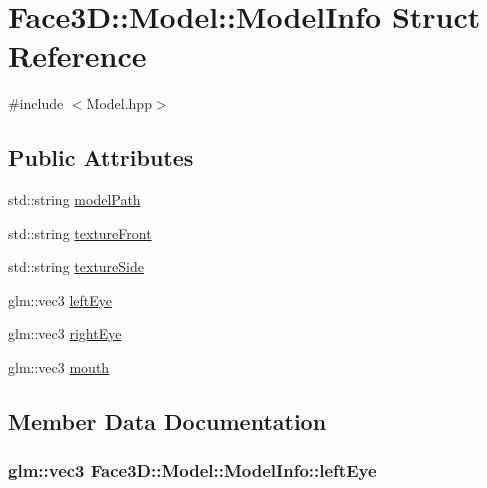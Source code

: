 \hypertarget{struct_face3_d_1_1_model_1_1_model_info}{}\section{Face3D\+:\+:Model\+:\+:Model\+Info Struct Reference}
\label{struct_face3_d_1_1_model_1_1_model_info}


{\ttfamily \#include $<$Model.\+hpp$>$}

\subsection*{Public Attributes}
\begin{DoxyCompactItemize}
\item 
std\+::string \hyperlink{struct_face3_d_1_1_model_1_1_model_info_a7f6cacf9ae39c86e2007f87dacff16e3}{model\+Path}
\item 
std\+::string \hyperlink{struct_face3_d_1_1_model_1_1_model_info_aa31a18f8553efbb08c1e06bbce4785d7}{texture\+Front}
\item 
std\+::string \hyperlink{struct_face3_d_1_1_model_1_1_model_info_a0afbed21c950938c52f4a02da26cfb75}{texture\+Side}
\item 
glm\+::vec3 \hyperlink{struct_face3_d_1_1_model_1_1_model_info_a8c085a7458ad7cadd13c64a632faa837}{left\+Eye}
\item 
glm\+::vec3 \hyperlink{struct_face3_d_1_1_model_1_1_model_info_acc12c6496e68aa15bcdf996f9bb3b58f}{right\+Eye}
\item 
glm\+::vec3 \hyperlink{struct_face3_d_1_1_model_1_1_model_info_ae0837733aacbb7d04ce34b2f240abf4f}{mouth}
\end{DoxyCompactItemize}


\subsection{Member Data Documentation}
\subsubsection[{\texorpdfstring{left\+Eye}{leftEye}}]{\setlength{\rightskip}{0pt plus 5cm}glm\+::vec3 Face3\+D\+::\+Model\+::\+Model\+Info\+::left\+Eye}\hypertarget{struct_face3_d_1_1_model_1_1_model_info_a8c085a7458ad7cadd13c64a632faa837}{}\label{struct_face3_d_1_1_model_1_1_model_info_a8c085a7458ad7cadd13c64a632faa837}
